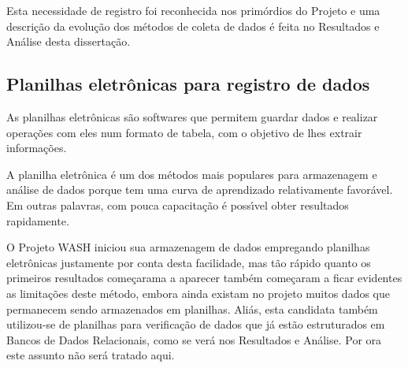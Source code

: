 \documentclass[
12pt,		%
openright,	%
twoside,  %
a4paper,			%
chapter=TITLE,		%
english,			%
french,				%
spanish,			%
brazil				%
]{USPSC-classe/USPSC}
\begin{document}
Esta necessidade de registro foi reconhecida nos prim\'ordios do Projeto e uma descri\c{c}\~ao da evolu\c{c}\~ao dos m\'etodos de coleta de dados \'e feita no Resultados e An\'alise desta disserta\c{c}\~ao.














\subsection[Planilhas eletr\^onicas para registro de dados]{Planilhas eletr\^onicas para registro de dados}\label{Planilhas eletr\^onicas para registro de dados}
As planilhas eletr\^onicas s\~ao softwares que permitem guardar  dados e realizar opera\c{c}\~oes com eles num formato de tabela, com o objetivo de lhes extrair informa\c{c}\~oes.














A planilha eletr\^onica \'e um dos m\'etodos mais populares para armazenagem e an\'alise de dados porque tem uma curva de aprendizado relativamente favor\'avel. Em outras palavras, com pouca capacita\c{c}\~ao \'e poss\'{\i}vel obter resultados rapidamente.














O Projeto WASH iniciou sua armazenagem de dados empregando planilhas eletr\^onicas justamente por conta desta facilidade, mas t\~ao r\'apido quanto os primeiros resultados come\c{c}arama a aparecer tamb\'em come\c{c}aram a ficar evidentes as limita\c{c}\~oes deste m\'etodo, embora ainda existam no projeto muitos dados que permanecem sendo armazenados em planilhas. Ali\'as, esta candidata tamb\'em utilizou-se de planilhas para verifica\c{c}\~ao de dados que j\'a est\~ao estruturados em Bancos de Dados Relacionais, como se ver\'a nos Resultados e An\'alise. Por ora este assunto n\~ao ser\'a tratado aqui.
\end{document}
